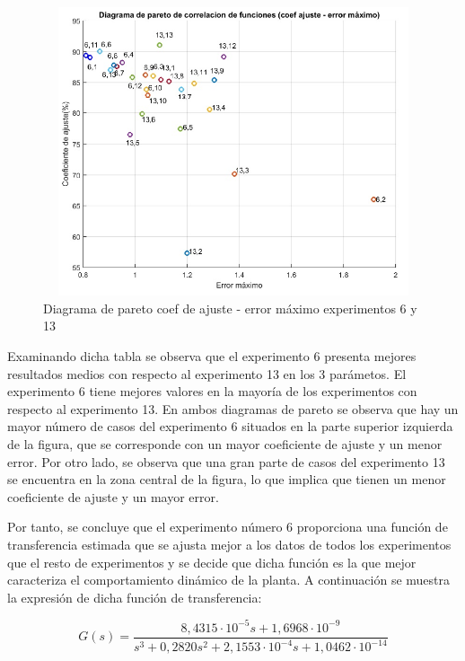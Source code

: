 \begin{figure}[H]
  \centering
  \includegraphics[width=115mm, height=85mm]{imagenes/anexo1/pareto2}
   \caption{Diagrama de pareto coef de ajuste - error máximo experimentos 6 y 13}
   \label{A1_2:pareto2}
\end{figure}

	Examinando dicha tabla se observa que el experimento 6 presenta mejores resultados medios con respecto al experimento 13 en los 3 parámetos. El experimento 6 tiene mejores valores en la mayoría de los experimentos con respecto al experimento 13. En ambos diagramas de pareto se observa que hay un mayor número de casos del experimento 6 situados en la parte superior izquierda de la figura, que se corresponde con un mayor coeficiente de ajuste y un menor error. Por otro lado, se observa que una gran parte de casos del experimento 13 se encuentra en la zona central de la figura, lo que implica que tienen un menor coeficiente de ajuste y un mayor error.

	Por tanto, se concluye que el experimento número 6 proporciona una función de transferencia estimada que se ajusta mejor a los datos de todos los experimentos  que el resto de experimentos y se decide que dicha función es la que mejor caracteriza el comportamiento dinámico de la planta. A continuación se muestra la expresión de dicha función de transferencia:

\begin{equation}\label{ecuacionA1_1}
           G(s) = \frac{8,4315 \cdot 10^{-5}s + 1,6968 \cdot 10^{-9}}{s^{3} + 0,2820s^{2} + 2,1553\cdot 10^{-4}s + 1,0462\cdot10^{-14}}
\end{equation} 

